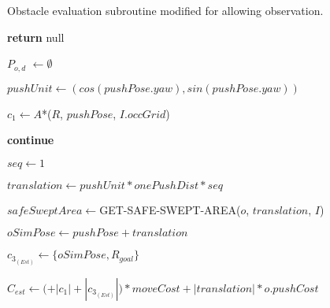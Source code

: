 \begin{algorithm}[H]

  \caption{Obstacle evaluation subroutine modified for allowing observation.}

  \label{alg:04-custom-observation-planforobstacle}

  \begin{algorithmic}[1]


        \State \textbf{return} null
      \EndIf

      \State $P_{o,d}$ $\gets \emptyset$

        \State $pushUnit \gets (cos(pushPose.yaw), sin(pushPose.yaw))$

        \State $c_{1} \gets A$*($R$, $pushPose$, $I.occGrid$)

          \State \textbf{continue}
        \EndIf

        \State {}


          \State {}

            \State {}
          \Else
            \State {}

              \State {}
            \EndIf
          \EndIf
        \EndIf

        \State $seq \gets 1$

        \State $translation \gets pushUnit * onePushDist * seq$

        \State $safeSweptArea \gets $GET-SAFE-SWEPT-AREA($o$, $translation$, $I$)

        \State $oSimPose \gets pushPose + translation$

        \State $c_{3_{(Est)}} \gets \{oSimPose, R_{goal}\}$

        \State $C_{est} \gets ($$ + |c_{1}| + |c_{3_{(Est)}}|) * moveCost + |translation| * o.pushCost$


\end{algorithmic}
\end{algorithm}

